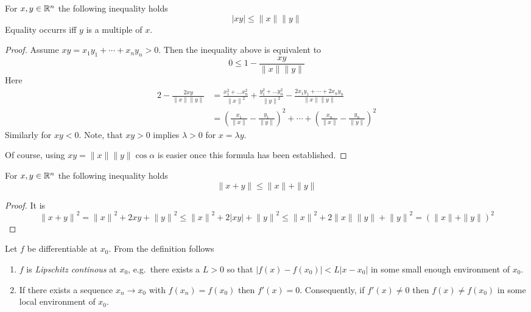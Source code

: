 \begin{lemma}\label{thm:lem_cauchy_schwarz_inequality}
    For \( x, y \in \mathbb{R}^n \) the following inequality holds
    \[
        |xy| \le \|x\| \|y\|
    \]
    Equality occurrs iff \( y \) is a multiple of \( x \).
\end{lemma}
\begin{proof}
    Assume \( xy = x_1 y_1 + \cdots + x_n y_n > 0 \). Then the inequality above is equivalent to
    \[ 0 \le 1 - \frac{xy}{\|x\| \|y\|} \]
    Here
    \[
        \begin{split}
            2 - \frac{2xy}{\|x\| \|y\|}
            & = \frac{x_1^2 + \dots x_n^2}{{\|x\|}^2} +
            \frac{y_1^2 + \dots y_n^2}{{\|y\|}^2} - \frac{2x_1 y_1 + \cdots + 2x_n y_n}{\|x\| \|y\|} \\
            & = {\left( \frac{x_1}{\|x\|} - \frac{y_1}{\|y\|} \right)}^2 + \cdots +
            {\left( \frac{x_n}{\|x\|} - \frac{y_n}{\|y\|} \right)}^2
        \end{split}
    \]
    Similarly for \( xy < 0 \). Note, that \( xy > 0 \) implies \( \lambda > 0 \) for \( x = \lambda y\).

    Of course, using \( xy = \|x\| \|y\| \cos\alpha \) is easier once this formula has been established.

\end{proof}
\bigskip


\begin{lemma}\label{lem:triangle_inequality}
    For \( x, y \in \mathbb{R}^n \) the following inequality holds
    \[
        \|x + y\| \le \|x\| + \|y\|
    \]
\end{lemma}
\begin{proof}
    It is
    \[
        {\|x + y\|}^2 = {\|x\|}^2 + 2xy + {\|y\|}^2 \le {\|x\|}^2 + 2|xy| + {\|y\|}^2
        \le {\|x\|}^2 + 2\|x\| \|y\| + {\|y\|}^2 = {(\|x\| + \|y\|)}^2
    \]
\end{proof}
\bigskip


\begin{remarks}Let \( f \) be differentiable at \( x_0 \). From the definition follows
    \begin{enumerate}
        \item \( f \) is \emph{Lipschitz continous} at \( x_0 \), e.g.\ there exists a \( L > 0 \) so that
              \( |f(x) - f(x_0)| < L|x - x_0| \) in some small enough environment of \( x_0 \).
        \item If there exists a sequence  \( x_n \to x_0 \) with \( f(x_n) = f(x_0) \) then \( f'(x) = 0 \).
              Consequently, if \( f'(x) \ne 0 \) then \( f(x) \ne f(x_0) \) in some local environment of \( x_0 \).
    \end{enumerate}
\end{remarks}
\bigskip

